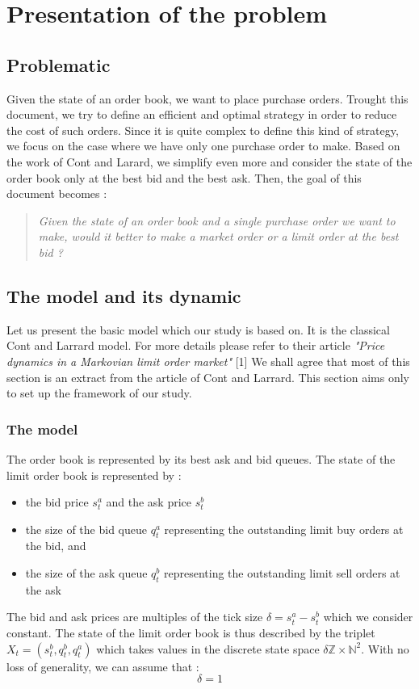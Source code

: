 \documentclass{article}
\begin{document}
\tableofcontents

\section{Presentation of the problem}

\subsection{Problematic}
Given the state of an order book, we want to place purchase orders. Trought this document, we try to define an efficient and optimal strategy in order to reduce the cost of such orders. Since it is quite complex to define this kind of strategy, we focus on the case where we have only one purchase order to make. Based on the work of Cont and Larard, we simplify even more and consider the state of the order book only at the best bid and the best ask. Then, the goal of this document becomes :
\begin{quote}
\textit{Given the state of an order book and a single purchase order we want to make, would it better to make a market order or a limit order at the best bid ?}
\end{quote}


\subsection{The model and its dynamic}
Let us present the basic model which our study is based on. It is the classical Cont and Larrard model. For more details please refer to their article \textit{"Price dynamics in a Markovian limit order market"} [1]
\newline
We shall agree that most of this section is an extract from the article of Cont and Larrard. This section aims only to set up the framework of our study.
\subsubsection{The model}
The order book is represented by its best ask and bid queues. The state of the limit order book is represented by :
\begin{itemize}
\item the bid price $ s_{t}^{a} $ and the ask price $ s_{t}^{b} $ 
\item the size of the bid queue $ q_{t}^{a} $ representing the outstanding limit buy orders at the bid, and 
\item the size of the ask queue $ q_{t}^{b} $ representing the outstanding limit sell orders at the ask 
\end{itemize}
The bid and ask prices are multiples of the tick size $\delta = s_{t}^{a} - s_{t}^{b}$ which we consider constant.
The state of the limit order book is thus described by the triplet $X_{t} = (s_{t}^{b}, q_{t}^{b}, q_{t}^{a})$ which takes values in the discrete state space $\delta \mathbb{Z} \times \mathbb{N}^{2} $. With no loss of generality, we can assume that  :
\begin{equation}
\delta = 1
\end{equation}
\end{document}
